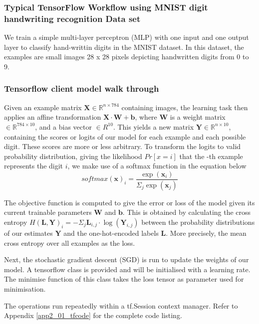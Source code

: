 \subsubsection{Typical TensorFlow Workflow using MNIST digit handwriting recognition Data set}\label{sec_c3_tfwf}
We train a simple multi-layer perceptron (MLP) with one input and one output layer to classify hand-writtin digits in the MNIST\citep{krizhevsky2012imagenet} dataset.   In this dataset, the examples are small images 28 x 28 pixels depicting handwritten digits from 0 to 9.

\subsubsection{Tensorflow client model walk through}
Given an example matrix $\mathbf{X}\in\mathbb{R}^{n\times 784}$ containing  images, the learning task then applies an affine transformation $\mathbf{X\cdot W+b}$, where $\mathbf{W}$ is a weight matrix $\in \mathbb{R}^{784 \times 10}$, and a bias vector $\in R^{10}$.  This yields a new matrix $\mathbf{Y}\in \mathbb{R}^{n\times 10}$, containing the scores or logits of our model for each example and each possible digit.  These scores are more or less arbitrary.  To transform the logits to valid probability distribution, giving the likelihood $Pr[x=i]$ that the -th example represents the digit $i$, we make use of a softmax function in the equation below
\begin{equation}
softmax(\mathbf{x})_i=\frac{\exp(\mathbf{x}_i)}{\Sigma_j\exp(\mathbf{x}_j)}\label{eqn_c3_smax00}
\end{equation} 

The objective function is computed to give the error or loss of the model given its current trainable parameters $\mathbf{W}$ and $\mathbf{b}$.  This is obtained by  calculating the  cross entropy     $H(\mathbf{L,Y})_i=−\Sigma_j\mathbf{L}_{i,j}\cdot\log(\mathbf{Y}_{i,j})$
between the probability distributions of our estimates $\mathbf{Y}$ and the one-hot-encoded labels $\mathbf{L}$.  More precisely, the mean cross entropy over all examples as the loss.

Next, the stochastic gradient descent (SGD) is run to update the weights of our model.  A tensorflow class is provided and will be initialised with a learning rate.  The minimise function of this class takes the loss tensor as parameter used for minimisation.

The operations run repeatedly within a tf.Session context manager. Refer to Appendix \ref{app2_01_tfcode} for the complete code listing.

